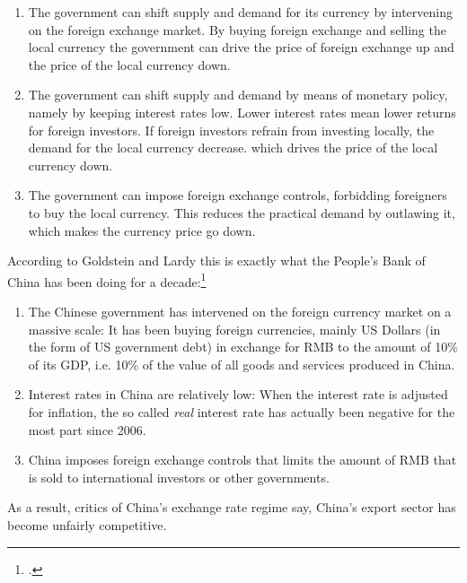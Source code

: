 \begin{enumerate}
\item{The government can shift supply and demand for its currency by 
	intervening on the foreign exchange market. By buying foreign 
exchange and selling the local currency the government can drive the 
price of foreign exchange up and the price of the local currency down.}
\item{The government can shift supply and demand by means of monetary 
	policy, namely by keeping interest rates low. Lower interest rates 
mean lower returns for foreign investors. If foreign investors refrain 
from investing locally, the demand for the local currency decrease.  
which drives the price of the local currency down.}
\item{The government can impose foreign exchange controls, forbidding 
	foreigners to buy the local currency. This reduces the practical 
demand by outlawing it, which makes the currency price go down.}
\end{enumerate}

According to Goldstein and Lardy this is exactly what the People's Bank 
of China has been doing for a decade:\footnote{\cite[pp.  
40]{Goldstein2008}.}

\begin{enumerate}
\item{The Chinese government has intervened on the foreign currency 
		market on a massive scale: It has been buying foreign 
		currencies, mainly US Dollars (in the form of US government 
		debt) in exchange for RMB to the amount of 10\% of its GDP, i.e. 
		10\% of the value of all goods and services produced in China.} 
	\item{Interest rates in China are relatively low: When the interest 
		rate is adjusted for inflation, the so called \emph{real} 
	interest rate has actually been negative for the most part since 
2006.}
\item{China imposes foreign exchange controls that limits the amount of 
	RMB that is sold to international investors or other governments.}
\end{enumerate}

As a result, critics of China's exchange rate regime say, China's export 
sector has become unfairly competitive. 

